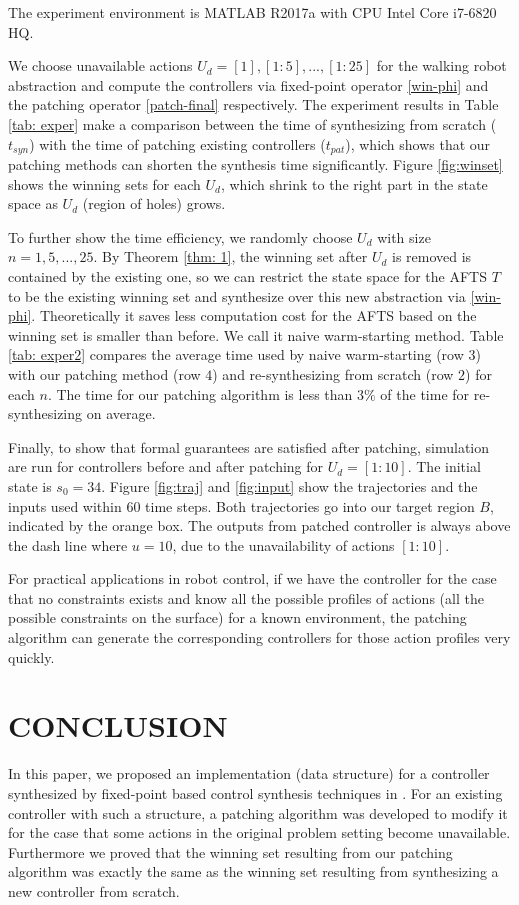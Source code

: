 The experiment environment is MATLAB R2017a with CPU Intel Core  i7-6820 HQ.

We choose unavailable actions $ U_d= [1],[1:5],...,[1:25] $ for the {\color{black} walking} robot abstraction and compute the controllers via fixed-point operator \eqref{win-phi} and the patching operator \eqref{patch-final} respectively.  The experiment results in Table \ref{tab: exper} make a comparison between the time of synthesizing from scratch ($ t_{syn} $) with the time of patching existing controllers ($ t_{pat} $), which shows that our patching methods can shorten the synthesis time significantly. Figure \ref{fig:winset} shows the winning sets for each $ U_d $, which shrink to the right part in the state space as $ U_d $ (region of holes) grows.

To further show the time efficiency, we randomly choose $ U_d $ with size $n = 1,5,...,25 $. By Theorem \ref{thm: 1}, the winning set after $ U_d $ is removed is contained by the existing one, so we can restrict the state space for the AFTS $ T $ to be the existing winning set and synthesize over this new abstraction via \eqref{win-phi}. Theoretically it saves less computation cost for the AFTS based on the winning set is smaller than before. We call it naive warm-starting method. Table \ref{tab: exper2} compares the average time used by naive warm-starting (row $ 3 $) with our patching method (row $ 4 $) and re-synthesizing from scratch (row $ 2 $) for each $ n $. The time for our patching algorithm is less than $ 3\% $ of the time for re-synthesizing on average.

Finally, to show that formal guarantees are satisfied after patching, simulation are run for controllers before and after patching for $ U_d =[1:10]$. The initial state is $ s_0=34 $. Figure \ref{fig:traj} and \ref{fig:input} show the trajectories and the inputs used within $ 60 $ time steps. Both trajectories go into our target region $ B $, indicated by the orange box. The outputs from patched controller is always above the dash line where $ u=10 $, due to the unavailability of actions $[1:10] $.

For practical applications in robot control, if we have the controller for the case that no constraints exists and know all the possible profiles of actions (all the possible constraints on the surface) for a known environment, the patching algorithm can generate the corresponding controllers for those action profiles very quickly. 

\section{CONCLUSION}
In this paper, we proposed an implementation (data structure) for a controller synthesized by fixed-point based control synthesis techniques in \cite{Nilsson2017}. For an existing controller with such a structure, a patching algorithm was developed to modify it for the case that some actions in the original problem setting become unavailable. Furthermore we proved that the winning set resulting from our patching algorithm was exactly the same as the winning set resulting from synthesizing a new controller from scratch. 

